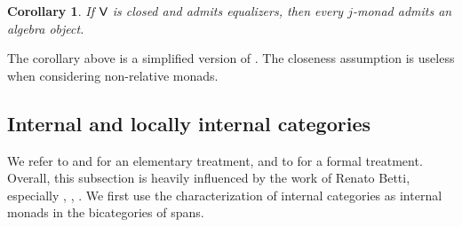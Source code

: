 \documentclass[10pt,a4paper]{article}
\newcommand{\cat}[1]{\textcat{#1}}
\newcommand{\textcat}[1]{{\normalfont\textsf{#1}}}
\theoremstyle{plain}
\newtheorem{corollary}[theorem]{Corollary}
\theoremstyle{definition}
\theoremstyle{remark}
\begin{document}
\begin{corollary}
    If $\cat V$ is closed and admits equalizers, then every $j$-monad admits an algebra object.
\end{corollary}

The corollary above is a simplified version of \cite[Corollary 8.20]{arkor2024formaltheoryrelativemonads}. The closeness assumption is useless when considering non-relative monads.

\subsection{Internal and locally internal categories}
\label{subsec:internal}

We refer to \cite[Chapter 8]{borceux1} and \cite[Chapter 2]{johnstone} for an elementary treatment, and to \cite{betti} for a formal treatment. Overall, this subsection is heavily influenced by the work of Renato Betti, especially \cite{bettiwalters_closedbicats}, \cite{bettiwalters_completness}, \cite{betti}. We first use the characterization of internal categories as internal monads in the bicategories of spans.
\end{document}
